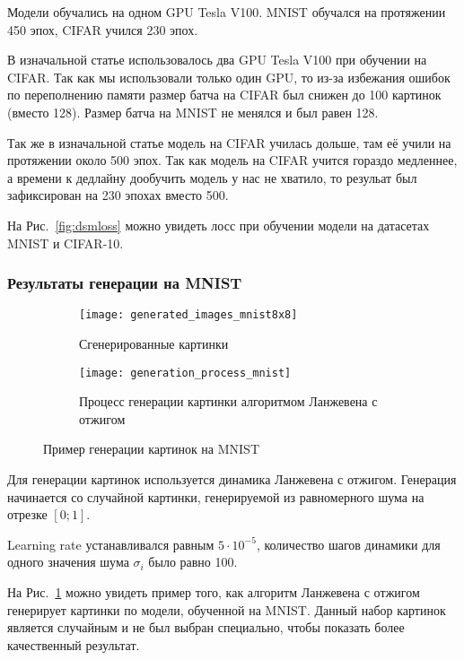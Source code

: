 \documentclass{article}
\begin{document}
Модели обучались на одном GPU Tesla V100. MNIST обучался
на протяжении 450 эпох, CIFAR учился 230 эпох.

В изначальной статье использовалось два GPU Tesla V100 при
обучении на CIFAR. Так как мы использовали только один GPU,
то из-за избежания ошибок по переполнению памяти размер
батча на CIFAR был снижен до 100 картинок (вместо 128).
Размер батча на MNIST не менялся и был равен 128.

Так же в изначальной статье модель на CIFAR училась дольше,
там её учили на протяжении около 500 эпох. Так как модель
на CIFAR учится гораздо медленнее, а времени к дедлайну
дообучить модель у нас не хватило, то резульат был зафиксирован
на 230 эпохах вместо 500.

На Рис.~\ref{fig:dsmloss} можно увидеть лосс при обучении
модели на датасетах MNIST и CIFAR-10.

\subsubsection{Результаты генерации на MNIST}

\begin{figure}
    \centering
    \begin{subfigure}[b]{0.45\textwidth}
    \texttt{[image: generated\_images\_mnist8x8]}
    \caption{Сгенерированные картинки}\label{fig:mnist8x8sample}
    \end{subfigure}
    \begin{subfigure}[b]{0.45\textwidth}
    \texttt{[image: generation\_process\_mnist]}
    \caption{Процесс генерации картинки алгоритмом Ланжевена с отжигом}\label{fig:mnist_gen}
    \end{subfigure}
    \caption{Пример генерации картинок на MNIST}
\end{figure}

Для генерации картинок используется динамика Ланжевена с отжигом.
Генерация начинается со случайной картинки, генерируемой из
равномерного шума на отрезке $[0; 1]$.

Learning rate устанавливался равным $5 \cdot 10^{-5}$, количество
шагов динамики для одного значения шума $\sigma_i$ было равно 100.

На Рис.~\ref{fig:mnist8x8sample} можно увидеть пример того, как алгоритм
Ланжевена с отжигом генерирует картинки по модели, обученной на MNIST.
Данный набор картинок является случайным и не был выбран специально, чтобы
показать более качественный результат.
\end{document}
